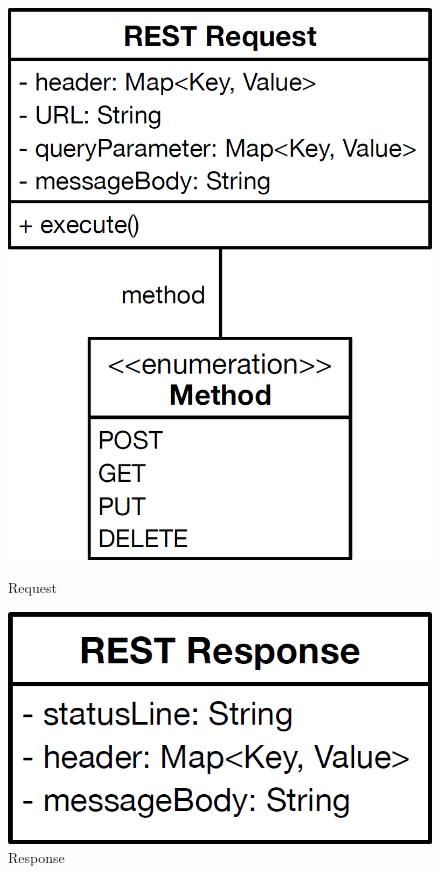 \begin{figure}[h]
\begin{minipage}[t]{0.3\linewidth}
\includegraphics[width=1\textwidth]{images/pattern_rest_request.png}
\caption{Request}
\end{minipage}
\hfill
\begin{minipage}[t]{0.3\linewidth}
\centering
\includegraphics[width=1\textwidth]{images/pattern_rest_response.png}
\caption{Response}
\end{minipage}
\end{figure}

\newpage